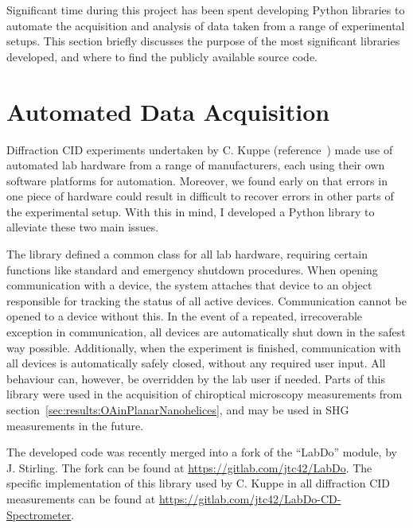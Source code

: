 Significant time during this project has been spent developing Python libraries to automate the acquisition and analysis of data taken from a range of experimental setups. This section briefly discusses the purpose of the most significant libraries developed, and where to find the publicly available source code.

\section{Automated Data Acquisition}\label{sec:appendix:labdo}
Diffraction CID experiments undertaken by C. Kuppe (reference~\cite{Kuppe2018}) made use of automated lab hardware from a range of manufacturers, each using their own software platforms for automation. Moreover, we found early on that errors in one piece of hardware could result in difficult to recover errors in other parts of the experimental setup. With this in mind, I developed a Python library to alleviate these two main issues. 

The library defined a common class for all lab hardware, requiring certain functions like standard and emergency shutdown procedures. When opening communication with a device, the system attaches that device to an object responsible for tracking the status of all active devices. Communication cannot be opened to a device without this. In the event of a repeated, irrecoverable exception in communication, all devices are automatically shut down in the safest way possible. Additionally, when the experiment is finished, communication with all devices is automatically safely closed, without any required user input. All behaviour can, however, be overridden by the lab user if needed. 
Parts of this library were used in the acquisition of chiroptical microscopy measurements from section~\ref{sec:results:OAinPlanarNanohelices}, and may be used in SHG measurements in the future.

The developed code was recently merged into a fork of the ``LabDo'' module, by J. Stirling. The fork can be found at \url{https://gitlab.com/jtc42/LabDo}.
The specific implementation of this library used by C. Kuppe in all diffraction CID measurements can be found at \url{https://gitlab.com/jtc42/LabDo-CD-Spectrometer}.


